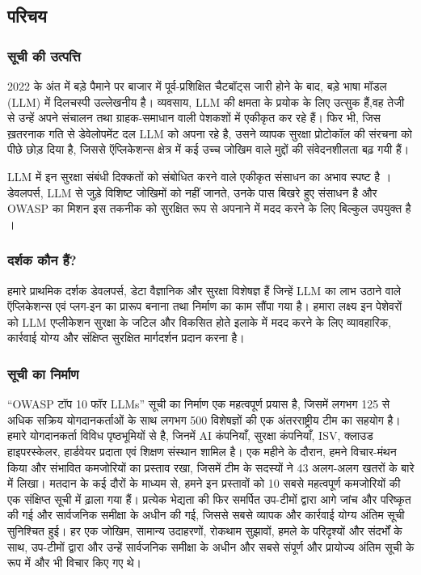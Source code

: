 \documentclass[
]{article}
\author{}
\date{}
\begin{document}
\subsection{परिचय}\label{ux92aux930ux91aux92f}

\subsubsection{सूची की
उत्पत्ति}\label{ux938ux91a-ux915-ux909ux924ux92aux924ux924}

2022 के अंत में बड़े पैमाने पर बाजार में पूर्व-प्रशिक्षित चैटबॉट्स जारी होने के बाद, बड़े
भाषा मॉडल (LLM) में दिलचस्पी उल्लेखनीय है। व्यवसाय, LLM की क्षमता के प्रयोक के लिए
उत्सुक हैं,वह तेजी से उन्हें अपने संचालन तथा ग्राहक-समाधान वाली पेशकशों में एकीकृत कर रहे
हैं। फिर भी, जिस ख़तरनाक गति से डेवेलोपमेंट दल LLM को अपना रहे है, उसने व्यापक सुरक्षा
प्रोटोकॉल की संरचना को पीछे छोड़ दिया है, जिससे ऍप्लिकेशन्स क्षेत्र में कई उच्च जोखिम
वाले मुद्दों की संवेदनशीलता बढ़ गयी हैं।

LLM में इन सुरक्षा संबंधी दिक्कतों को संबोधित करने वाले एकीकृत संसाधन का अभाव स्पष्ट है
। डेवलपर्स, LLM से जुड़े विशिष्ट जोखिमों को नहीं जानते, उनके पास बिखरे हुए संसाधन है और
OWASP का मिशन इस तकनीक को सुरक्षित रूप से अपनाने में मदद करने के लिए बिल्कुल उपयुक्त
है ।

\subsubsection{दर्शक कौन हैं?}\label{ux926ux930ux936ux915-ux915ux928-ux939}

हमारे प्राथमिक दर्शक डेवलपर्स, डेटा वैज्ञानिक और सुरक्षा विशेषज्ञ हैं जिन्हें LLM का लाभ
उठाने वाले ऍप्लिकेशन्स एवं प्लग-इन का प्रारूप बनाना तथा निर्माण का काम सौंपा गया है।
हमारा लक्ष्य इन पेशेवरों को LLM एप्लीकेशन सुरक्षा के जटिल और विकसित होते इलाके में मदद
करने के लिए व्यावहारिक, कार्रवाई योग्य और संक्षिप्त सुरक्षित मार्गदर्शन प्रदान करना
है।

\subsubsection{सूची का
निर्माण}\label{ux938ux91a-ux915-ux928ux930ux92eux923}

``OWASP टॉप 10 फॉर LLMs'' सूची का निर्माण एक महत्वपूर्ण प्रयास है, जिसमें लगभग
125 से अधिक सक्रिय योगदानकर्ताओं के साथ लगभग 500 विशेषज्ञों की एक अंतरराष्ट्रीय टीम
का सहयोग है। हमारे योगदानकर्ता विविध पृष्ठभूमियों से है, जिनमें AI कंपनियाँ, सुरक्षा
कंपनियाँ, ISV, क्लाउड हाइपरस्केलर, हार्डवेयर प्रदाता एवं शिक्षण संस्थान शामिल है। एक
महीने के दौरान, हमने विचार-मंथन किया और संभावित कमजोरियों का प्रस्ताव रखा, जिसमें
टीम के सदस्यों ने 43 अलग-अलग खतरों के बारे में लिखा। मतदान के कई दौरों के माध्यम से,
हमने इन प्रस्तावों को 10 सबसे महत्वपूर्ण कमजोरियों की एक संक्षिप्त सूची में ढ़ाला गया हैं।
प्रत्येक भेद्यता की फिर समर्पित उप-टीमों द्वारा आगे जांच और परिष्कृत की गई और
सार्वजनिक समीक्षा के अधीन की गई, जिससे सबसे व्यापक और कार्रवाई योग्य अंतिम सूची
सुनिश्चित हुई। हर एक जोखिम, सामान्य उदाहरणों, रोकथाम सुझावों, हमले के परिदृश्यों और
संदर्भों के साथ, उप-टीमों द्वारा और उन्हें सार्वजनिक समीक्षा के अधीन और सबसे संपूर्ण और
प्रायोज्य अंतिम सूची के रूप में और भी विचार किए गए थे।
\end{document}
